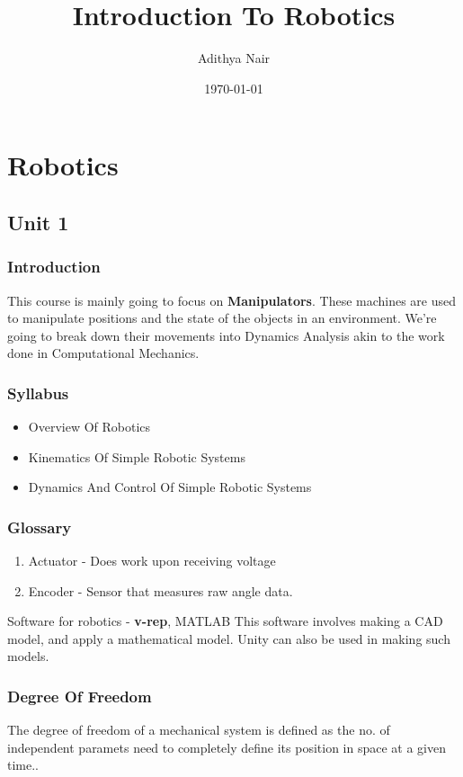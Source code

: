 \documentclass[11pt]{report}
\author{Adithya Nair}
\date{\today}
\title{Introduction To Robotics}
\begin{document}
\maketitle
\tableofcontents

\part{Robotics}
\label{sec:org8a4fe2b}
\chapter{Unit 1}
\label{sec:org6517a73}
\section{Introduction}
\label{sec:org2967295}
This course is mainly going to focus on \textbf{Manipulators}. These machines are used to manipulate positions and the state of the objects in an environment. We're going to break down their movements into Dynamics Analysis akin to the work done in Computational Mechanics.
\section{Syllabus}
\label{sec:org8be1727}
\begin{itemize}
\item Overview Of Robotics
\item Kinematics Of Simple Robotic Systems
\item Dynamics And Control Of Simple Robotic Systems
\end{itemize}
\section{Glossary}
\label{sec:org6e4bcca}
\begin{enumerate}
\item Actuator - Does work upon receiving voltage
\item Encoder - Sensor that measures raw angle data.
\end{enumerate}


Software for robotics - \textbf{v-rep}, MATLAB
This software involves making a CAD model, and apply a mathematical model. Unity can also be used in making such models.
\section{Degree Of Freedom}
\label{sec:org1a97b53}
The degree of  freedom of a mechanical system is defined as the no. of independent paramets need to completely define its position in space at a given time..
\end{document}
